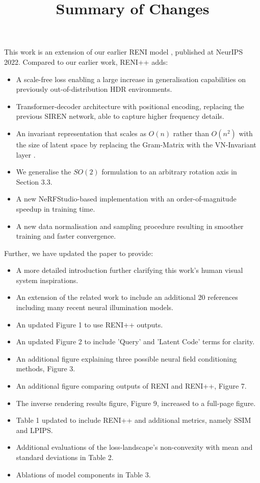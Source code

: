 \documentclass{article}
\begin{document}
\title{Summary of Changes}
\date{}
\maketitle

\noindent This work is an extension of our earlier RENI model \cite{gardner2022rotation}, published at NeurIPS 2022. Compared to our earlier work, RENI++ adds: 
\begin{itemize}
\item[--] A scale-free loss enabling a large increase in generalisation capabilities on previously out-of-distribution HDR environments.
\item[--] Transformer-decoder architecture with positional encoding, replacing the previous SIREN network, able to capture higher frequency details.
\item[--] An invariant representation that scales as \(O(n)\) rather than \(O(n^{2})\) with the size of latent space by replacing the Gram-Matrix with the VN-Invariant layer \cite{deng_vector_2021}.
\item[--] We generalise the $SO(2)$ formulation to an arbitrary rotation axis in Section 3.3.
\item[--] A new NeRFStudio-based \cite{nerfstudio} implementation with an order-of-magnitude speedup in training time. 
\item[--] A new data normalisation and sampling procedure resulting in smoother training and faster convergence.
\end{itemize}

\noindent Further, we have updated the paper to provide:
\begin{itemize}
\item[--] A more detailed introduction further clarifying this work's human visual system inspirations.
\item[--] An extension of the related work to include an additional 20 references including many recent neural illumination models. 
\item[--] An updated Figure 1 to use RENI++ outputs.
\item[--] An updated Figure 2 to include 'Query' and 'Latent Code' terms for clarity.
\item[--] An additional figure explaining three possible neural field conditioning methods, Figure 3.
\item[--] An additional figure comparing outputs of RENI and RENI++, Figure 7.
\item[--] The inverse rendering results figure, Figure 9, increased to a full-page figure.
\item[--] Table 1 updated to include RENI++ and additional metrics, namely SSIM and LPIPS.
\item[--] Additional evaluations of the loss-landscape's non-convexity with mean and standard deviations in Table 2.
\item[--] Ablations of model components in Table 3.
\end{itemize}



\end{document}
